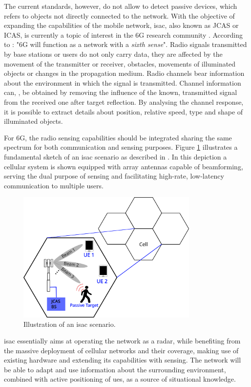 The current standards, however, do not allow to detect passive devices, which refers to objects not directly connected to the network.
With the objective of expanding the capabilities of the mobile network, \gls{isac}, also known as JCAS or ICAS, is currently a topic of interest in the 6G research community \cite{Mandelli_Henninger_Bauhofer_Wild_2023}.
According to \cite{Viswanathan_Wild_2021}: "6G will function as a network with a \textit{sixth sense}". Radio signals transmitted by base stations or users do not only carry data, they are affected by the movement of the transmitter or receiver, obstacles, movements of illuminated objects or changes in the propagation medium. Radio channels bear information about the environment in which the signal is transmitted. 
Channel information can, \eg, be obtained by removing the influence of the known, transmitted signal from the received one after target reflection. By analysing the channel response, it is possible to extract details about position, relative speed, type and shape of illuminated objects.

For 6G, the radio sensing capabilities should be integrated sharing the same spectrum for both communication and sensing purposes. Figure \ref{fig:isac-scheme-1} illustrates a fundamental sketch of an \gls{isac} scenario as described in \cite{Wild_Grudnitsky_Mandelli_Henninger_Guan_Schaich_2023}. In this depiction a cellular system is shown equipped with array antennas capable of beamforming, serving the dual purpose of sensing and facilitating high-rate, low-latency communication to multiple users.
\begin{figure}[t]
	\centering
	\includegraphics[width=0.8\textwidth]{Images/introduction/isac-scheme-1.png}
	\caption{Illustration of an \gls{isac} scenario.}
	\label{fig:isac-scheme-1}
\end{figure}
\Gls{isac} essentially aims at operating the network as a radar, while benefiting from the massive deployment of cellular networks and their coverage, making use of existing hardware and extending its capabilities with sensing.
The network will be able to adapt and use information about the surrounding environment, combined with active positioning of \glspl{ue}, as a source of situational knowledge.



